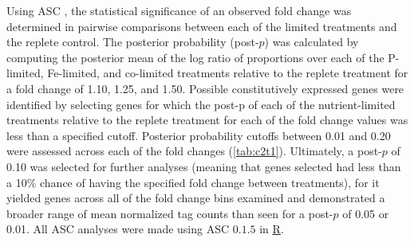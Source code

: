 Using ASC \citep{Wu2010}, the statistical significance of an observed fold change was determined in pairwise comparisons between each of the limited treatments and the replete control. The posterior probability (post-$p$) was calculated by computing the posterior mean of the log ratio of proportions over each of the P-limited, Fe-limited, and co-limited treatments relative to the replete treatment for a fold change of 1.10, 1.25, and 1.50. Possible constitutively expressed genes were identified by selecting genes for which the post-p of each of the nutrient-limited treatments relative to the replete treatment for each of the fold change values was less than a specified cutoff. Posterior probability cutoffs between 0.01 and 0.20 were assessed across each of the fold changes (\cref{tab:c2t1}). Ultimately, a post-$p$ of 0.10 was selected for further analyses (meaning that genes selected had less than a 10\% chance of having the specified fold change between treatments), for it yielded genes across all of the fold change bins examined and demonstrated a broader range of mean normalized tag counts than seen for a post-$p$ of 0.05 or 0.01. All ASC analyses were made using ASC $0.1.5$ in \href{http://R-project.org}{R}. \par

